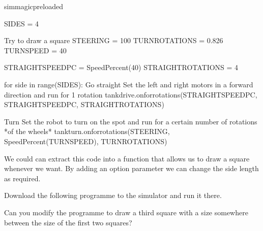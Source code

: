 \documentclass[letterpaper,10pt,english]{sphinxmanual}
\begin{document}
{
\begin{sphinxVerbatim}[commandchars=\\\{\}]
\llap{\color{nbsphinxin}[ ]:\,\hspace{\fboxrule}\hspace{\fboxsep}}\PYGZpc{}\PYGZpc{}sim\PYGZus{}magic\PYGZus{}preloaded

SIDES = 4

\PYGZsh{} Try to draw a square
STEERING = \PYGZhy{}100
TURN\PYGZus{}ROTATIONS = 0.826
TURN\PYGZus{}SPEED = 40

STRAIGHT\PYGZus{}SPEED\PYGZus{}PC = SpeedPercent(40)
STRAIGHT\PYGZus{}ROTATIONS = 4

for side in range(SIDES):
    \PYGZsh{}Go straight
    \PYGZsh{} Set the left and right motors in a forward direction
    \PYGZsh{} and run for 1 rotation
    tank\PYGZus{}drive.on\PYGZus{}for\PYGZus{}rotations(STRAIGHT\PYGZus{}SPEED\PYGZus{}PC,
                                STRAIGHT\PYGZus{}SPEED\PYGZus{}PC,
                                STRAIGHT\PYGZus{}ROTATIONS)

    \PYGZsh{}Turn
    \PYGZsh{} Set the robot to turn on the spot
    \PYGZsh{} and run for a certain number of rotations *of the wheels*
    tank\PYGZus{}turn.on\PYGZus{}for\PYGZus{}rotations(STEERING,
                               SpeedPercent(TURN\PYGZus{}SPEED),
                               TURN\PYGZus{}ROTATIONS)
\end{sphinxVerbatim}
}

We could can extract this code into a function that allows us to draw a square whenever we want. By adding an option  parameter we can change the side length as required.

Download the following programme to the simulator and run it there.

Can you modify the programme to draw a third square with a size somewhere between the size of the first two squares?
\end{document}
